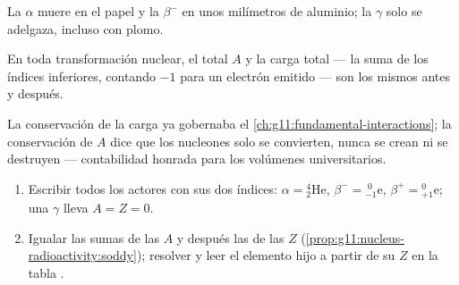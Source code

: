 \begin{omfigure}

{\small La $\alpha$ muere en el papel y la $\beta^-$ en unos milímetros
de aluminio; la $\gamma$ solo se adelgaza, incluso con plomo.}
\end{omfigure}

\begin{proposition}\label{prop:g11:nucleus-radioactivity:soddy}
En toda transformación nuclear, el  total $A$ y la carga
total --- la suma de los índices inferiores, contando $-1$ para un
electrón emitido --- son los mismos antes y después.
\end{proposition}
\admitted

\begin{remark}
La conservación de la carga ya gobernaba el
\cref{ch:g11:fundamental-interactions}; la conservación de $A$ dice que
los nucleones solo se convierten, nunca se crean ni se destruyen ---
contabilidad honrada para los volúmenes universitarios.
\end{remark}

\begin{method}\label{met:g11:nucleus-radioactivity:balance}
\begin{enumerate}
  \item Escribir todos los actores con sus dos índices:
        $\alpha = {}^{4}_{2}\mathrm{He}$,
        $\beta^- = {}^{\;0}_{-1}\mathrm{e}$,
        $\beta^+ = {}^{0}_{+1}\mathrm{e}$; una $\gamma$ lleva
        $A = Z = 0$.
  \item Igualar las sumas de las $A$ y después las de las $Z$
        (\cref{prop:g11:nucleus-radioactivity:soddy}); resolver y leer el
        elemento hijo a partir de su $Z$ en la tabla .
\end{enumerate}
\end{method}

